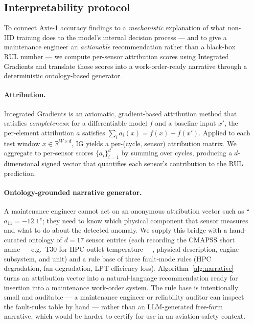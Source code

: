 \documentclass[preprint,12pt,authoryear]{elsarticle}
\begin{document}
\subsection{Interpretability protocol}
\label{subsec:interpretability}

To connect Axis-1 accuracy findings to a \emph{mechanistic}
explanation of what non-IID training does to the model's internal
decision process --- and to give a maintenance engineer an
\emph{actionable} recommendation rather than a black-box RUL number
--- we compute per-sensor attribution scores using Integrated
Gradients \citep{Sundararajan2017IntegratedGradients} and translate
those scores into a work-order-ready narrative through a
deterministic ontology-based generator.

\paragraph{Attribution.}
Integrated Gradients is an axiomatic, gradient-based attribution
method that satisfies \emph{completeness}: for a differentiable
model $f$ and a baseline input $x'$, the per-element attribution
$a$ satisfies $\sum_i a_i(x) = f(x) - f(x')$. Applied to each test
window $x \in \mathbb{R}^{W \times d}$, IG yields a per-(cycle,
sensor) attribution matrix. We aggregate to per-sensor scores
$\{a_i\}_{i=1}^d$ by summing over cycles, producing a
$d$-dimensional signed vector that quantifies each sensor's
contribution to the RUL prediction.

\paragraph{Ontology-grounded narrative generator.}
A maintenance engineer cannot act on an anonymous attribution
vector such as ``$a_{11} = -12.1$''; they need to know which
physical component that sensor measures and what to do about the
detected anomaly. We supply this bridge with a hand-curated
ontology of $d = 17$ sensor entries (each recording the CMAPSS
short name --- e.g.\ T30 for HPC-outlet temperature ---, physical
description, engine subsystem, and unit) and a rule base of three
fault-mode rules (HPC degradation, fan degradation, LPT efficiency
loss). Algorithm~\ref{alg:narrative} turns an attribution vector
into a natural-language recommendation ready for insertion into a
maintenance work-order system. The rule base is intentionally
small and auditable --- a maintenance engineer or reliability
auditor can inspect the fault-rules table by hand --- rather than
an LLM-generated free-form narrative, which would be harder to
certify for use in an aviation-safety context.
\end{document}
